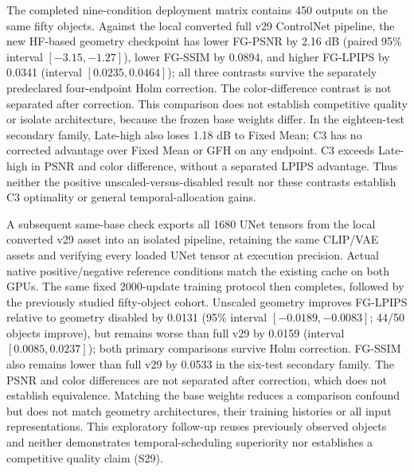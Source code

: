 The completed nine-condition deployment matrix contains 450 outputs on the same fifty objects. Against the local converted full v29 ControlNet pipeline, the new HF-based geometry checkpoint has lower FG-PSNR by 2.16 dB (paired 95\% interval $[-3.15,-1.27]$), lower FG-SSIM by 0.0894, and higher FG-LPIPS by 0.0341 (interval $[0.0235,0.0464]$); all three contrasts survive the separately predeclared four-endpoint Holm correction. The color-difference contrast is not separated after correction. This comparison does not establish competitive quality or isolate architecture, because the frozen base weights differ. In the eighteen-test secondary family, Late-high also loses 1.18 dB to Fixed Mean; C3 has no corrected advantage over Fixed Mean or GFH on any endpoint. C3 exceeds Late-high in PSNR and color difference, without a separated LPIPS advantage. Thus neither the positive unscaled-versus-disabled result nor these contrasts establish C3 optimality or general temporal-allocation gains.

A subsequent same-base check exports all 1680 UNet tensors from the local converted v29 asset into an isolated pipeline, retaining the same CLIP/VAE assets and verifying every loaded UNet tensor at execution precision. Actual native positive/negative reference conditions match the existing cache on both GPUs. The same fixed 2000-update training protocol then completes, followed by the previously studied fifty-object cohort. Unscaled geometry improves FG-LPIPS relative to geometry disabled by 0.0131 (95\% interval $[-0.0189,-0.0083]$; 44/50 objects improve), but remains worse than full v29 by 0.0159 (interval $[0.0085,0.0237]$); both primary comparisons survive Holm correction. FG-SSIM also remains lower than full v29 by 0.0533 in the six-test secondary family. The PSNR and color differences are not separated after correction, which does not establish equivalence. Matching the base weights reduces a comparison confound but does not match geometry architectures, their training histories or all input representations. This exploratory follow-up reuses previously observed objects and neither demonstrates temporal-scheduling superiority nor establishes a competitive quality claim (S29).


